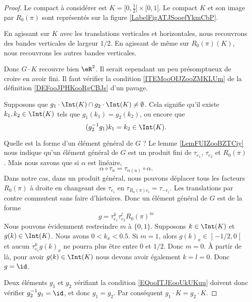 \begin{proof}
    Le compact à considérer est \( K=\mathopen[ 0 , \frac{ 1 }{2} \mathclose]\times \mathopen[ 0 , 1 \mathclose]\). Le compact \( K\) et son image par \( R_0(\pi)\) sont représentés sur la figure \ref{LabelFigATJSooefYkmCbP}. %

    En agissant sur \( K\) avec les translations verticales et horizontales, nous recouvrons des bandes verticales de largeur \( 1/2\). En agissant de même sur \( R_0(\pi)(K) \), nous recouvrons les autres bandes verticales.

    Donc \( G\cdot K\) recouvre bien \( \eR^2\). Il serait cependant un peu présomptueux de croire en avoir fini. Il faut vérifier la condition \ref{ITEMooOIJZooZMKLUm} de la définition \ref{DEFooJPHKooRgCBJs} d'un pavage.

    Supposons que \( g_1\cdot\Int(K)\cap g_2\cdot \Int(K)\neq \emptyset\). Cela signifie qu'il existe \( k_1,k_2\in \Int(K)\) tels que \( g_1(k_1)=g_2(k_2)\), ou encore que
    \begin{equation}        \label{EQooITJEooUkUKuu}
        (g_2^{-1}g_1)k_1=k_2\in \Int(K).
    \end{equation}

    Quelle est la forme d'un élément général de \( G\) ? Le lemme \ref{LemFUIZooBZTCiy} nous indique qu'un élément général de \( G\) est un produit fini de \( \tau_{e_1}\), \( \tau_{e_2}\) et \( R_0(\pi)\). Mais nous savons que si \( \alpha\) est linéaire,
    \begin{equation}
        \alpha\circ \tau_u=\tau_{\alpha(u)}\circ \alpha.
    \end{equation}
    Dans notre cas, dans un produit général, nous pouvons déplacer tous les facteurs \( R_0(\pi)\) à droite en changeant des \( \tau_{e_i}\) en \( \tau_{R_0(\pi)e_i}=\tau_{-e_i}\). Les translations par contre commutent sans faire d'histoires. Donc un élément général de \( G\) est de la forme
    \begin{equation}
        g=\tau_{e_1}^k\tau_{e_2}^lR_0(\pi)^m
    \end{equation}
    Nous pouvons évidemment restreindre \( m\) à \( \{ 0,1 \}\). Supposons \( k\in \Int(K)\) et \( g(k)\in \Int(K)\). Nous avons \( 0<k_x<0.5\). Si \(m=1 \), alors \( g(k)_x\in\mathopen] -1/2 , 0 \mathclose[\) et aucun \( \tau_{e_1}^kg(k)_x\) ne pourra plus être entre \( 0\) et \( 1/2\). Donc \( m=0\). À partir de là, pour avoir \( g(k)\in \Int(K)\) nous devons avoir également \( k=l=0\). Donc \( g=\id\).

    Deux éléments \( g_1\) et \( g_2\) vérifiant la condition \eqref{EQooITJEooUkUKuu} doivent donc vérifier \( g_2^{-1}g_1=\id\), et donc \( g_1=g_2\). Par conséquent \( g_1\cdot K=g_2\cdot K\).
\end{proof}

